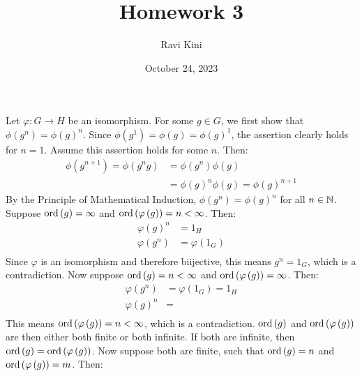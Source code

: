 \documentclass{article}
\title{Homework 3}
\author{Ravi Kini}
\date{October 24, 2023}
\begin{document}
\maketitle

\problem
Let $\varphi: G \to H$ be an isomorphism. For some $g \in G$, we first show that $\phi\left(g^n\right) = \phi\left(g\right)^n$. Since $\phi\left(g^1\right) = \phi\left(g\right) = \phi\left(g\right)^1$, the assertion clearly holds for $n = 1$. Assume this assertion holds for some $n$. Then:
\begin{equation}
    \begin{split}
        \phi\left(g^{n+1}\right) = \phi\left(g^ng\right) & = \phi\left(g^n\right)\phi\left(g\right) \\
        & = \phi\left(g\right)^n\phi\left(g\right) = \phi\left(g\right)^{n+1}
    \end{split}
\end{equation}
By the Principle of Mathematical Induction, $\phi\left(g^n\right) = \phi\left(g\right)^n$ for all $n \in \mathbb{N}$.
Suppose $\operatorname{ord}\left(g\right) = \infty$ and $\operatorname{ord}\left(\varphi\left(g\right)\right) = n < \infty$. Then:
\begin{equation}
    \begin{split}
        \varphi\left(g\right)^n & = 1_H \\
        \varphi\left(g^n\right) & = \varphi\left(1_G\right) \\
    \end{split}
\end{equation}
Since  $\varphi$ is an isomorphism and therefore biijective, this means $g^n = 1_G$, which is a contradiction. Now suppose $\operatorname{ord}\left(g\right) = n < \infty$ and $\operatorname{ord}\left(\varphi\left(g\right)\right) = \infty$. Then:
\begin{equation}
    \begin{split}
        \varphi\left(g^n\right) & = \varphi\left(1_G\right) = 1_H \\
        \varphi\left(g\right)^n & = \\
    \end{split}
\end{equation}
This means $\operatorname{ord}\left(\varphi\left(g\right)\right) = n < \infty$, which is a contradiction. $\operatorname{ord}\left(g\right)$ and $\operatorname{ord}\left(\varphi\left(g\right)\right)$ are then either both finite or both infinite. If both are infinite, then $\operatorname{ord}\left(g\right) = \operatorname{ord}\left(\varphi\left(g\right)\right)$. Now suppose both are finite, such that $\operatorname{ord}\left(g\right) = n$ and $\operatorname{ord}\left(\varphi\left(g\right)\right) = m$. Then:
\end{document}
